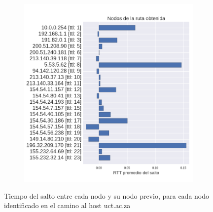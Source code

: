 \begin{figure}[ht]
  \begin{subfigure}[b]{.5\textwidth}
    \hspace*{-1.5cm}
    \includegraphics[width=1.2\textwidth]{Imagenes/capetown_rtts.png}
  \end{subfigure}
  \label{fig:capetown_rtts}
  \caption{Tiempo del salto entre cada nodo y su nodo previo, para cada nodo identificado en el camino al host uct.ac.za}
\end{figure}

